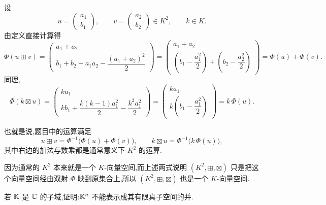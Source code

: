 \begin{problem}
\begin{solution}
        设
        \[
            u=\begin{pmatrix} a_1\\ b_1 \end{pmatrix},\qquad
            v=\begin{pmatrix} a_2\\ b_2 \end{pmatrix}\in K^2,\qquad
            k\in K.
        \]
        由定义直接计算得
        \[
            \Phi(u\boxplus v)
            =
            \begin{pmatrix}
                a_1+a_2\\
                b_1+b_2+a_1a_2-\dfrac{(a_1+a_2)^2}{2}
            \end{pmatrix}
            =
            \begin{pmatrix}
                a_1+a_2\\
                \left(b_1-\dfrac{a_1^2}{2}\right)+\left(b_2-\dfrac{a_2^2}{2}\right)
            \end{pmatrix}
            =\Phi(u)+\Phi(v).
        \]
        同理,
        \[
            \Phi(k\boxtimes u)
            =
            \begin{pmatrix}
                ka_1\\
                kb_1+\dfrac{k(k-1)a_1^2}{2}-\dfrac{k^2a_1^2}{2}
            \end{pmatrix}
            =
            \begin{pmatrix}
                ka_1\\
                k\left(b_1-\dfrac{a_1^2}{2}\right)
            \end{pmatrix}
            =k\,\Phi(u).
        \]

        也就是说,题目中的运算满足
        \[
            u\boxplus v=\Phi^{-1}\bigl(\Phi(u)+\Phi(v)\bigr),\qquad
            k\boxtimes u=\Phi^{-1}\bigl(k\,\Phi(u)\bigr),
        \]
        其中右边的加法与数乘都是通常意义下 $K^2$ 的运算.

        因为通常的 $K^2$ 本来就是一个 $K$-向量空间,而上述两式说明 $(K^2,\boxplus,\boxtimes)$ 只是把这个向量空间经由双射 $\Phi$ 映到原集合上,所以 $(K^2,\boxplus,\boxtimes)$ 也是一个 $K$-向量空间.
    \end{solution}
\end{problem}

\begin{problem}
    若 $\mathbb{K}$ 是 $\mathbb{C}$ 的子域,证明:$\mathbb{K}^n$ 不能表示成其有限真子空间的并.
\end{problem}

